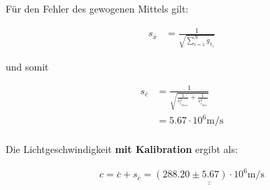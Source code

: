 F\"ur den Fehler des gewogenen Mittels gilt:

\begin{align*}
    s_{\overline{x}} &= \frac{1}{\sqrt{\sum_{i=1}^{N} g_{\overline{x}_i}}}
\end{align*}

und somit

\begin{align*}
    s_{\overline{c}} &= \frac{1}{ \sqrt{\frac{1}{s_{\overline{c_{Remo}}}^2} + \frac{1}{s_{\overline{c_{Alex}}}^2}}} \\
                     &= 5.67 \cdot 10^6 \textrm{m}/\textrm{s} \\
\end{align*}

Die Lichtgeschwindigkeit \textbf{mit Kalibration} ergibt als:

\begin{align*}
    c = \overline{c} + s_{\overline{c}} = \underline{\underline{(288.20 \pm 5.67) \cdot 10^6 \textrm{m}/\textrm{s}}}
\end{align*}

